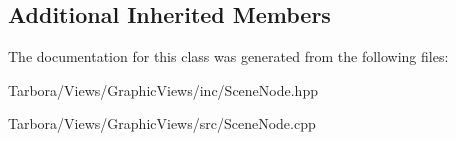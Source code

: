 \subsection*{Additional Inherited Members}


The documentation for this class was generated from the following files\+:\begin{DoxyCompactItemize}
\item 
Tarbora/\+Views/\+Graphic\+Views/inc/Scene\+Node.\+hpp\item 
Tarbora/\+Views/\+Graphic\+Views/src/Scene\+Node.\+cpp\end{DoxyCompactItemize}
